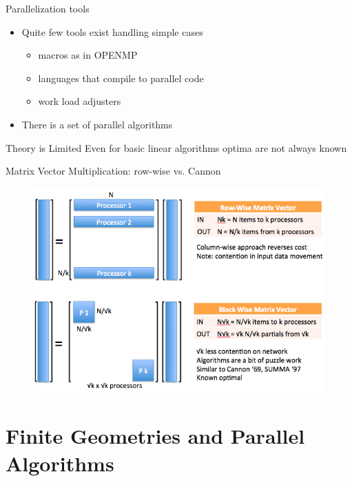 \documentclass{beamer}
\begin{document}
\begin{frame}{Parallelization tools}
\begin{itemize}
    \item Quite few tools exist handling simple cases
        \begin{itemize}
            \item macros as in OPENMP
            \item languages that compile to parallel code
            \item work load adjusters
        \end{itemize}
    \item There is a set of parallel algorithms
\end{itemize}

\begin{alertblock}{Theory is Limited}
Even for basic linear algorithms optima are not always known
\end{alertblock}
\end{frame}

\begin{frame}{Matrix Vector Multiplication: row-wise vs. Cannon}


\begin{figure}
\includegraphics[scale=0.45]{row-wise-vs-cannon.png}
\end{figure}

\end{frame}

\section{Finite Geometries and Parallel Algorithms}  %
\end{document}

